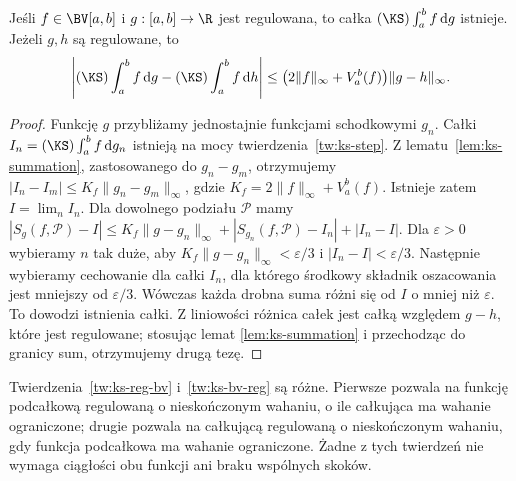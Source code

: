 \begin{twierdzenie}
\label{tw:ks-bv-reg}
Jeśli $f\in\BV[a,b]$ i $g:[a,b]\to\R$ jest regulowana, to całka $(\KS)\int_a^b f\,\mathrm dg$ istnieje. Jeżeli $g,h$ są regulowane, to
\[
 \left|(\KS)\int_a^b f\,\mathrm dg-(\KS)\int_a^b f\,\mathrm dh\right|
 \le\bigl(2\|f\|_\infty+V_a^b(f)\bigr)\|g-h\|_\infty.
\]
\end{twierdzenie}
\begin{proof}
Funkcję $g$ przybliżamy jednostajnie funkcjami schodkowymi $g_n$. Całki $I_n=(\KS)\int_a^b f\,\mathrm dg_n$ istnieją na mocy twierdzenia~\ref{tw:ks-step}. Z lematu~\ref{lem:ks-summation}, zastosowanego do $g_n-g_m$, otrzymujemy $|I_n-I_m|\le K_f\|g_n-g_m\|_\infty$, gdzie $K_f=2\|f\|_\infty+V_a^b(f)$. Istnieje zatem $I=\lim_nI_n$. Dla dowolnego podziału $\mathcal P$ mamy
$|S_g(f,\mathcal P)-I|\le K_f\|g-g_n\|_\infty+|S_{g_n}(f,\mathcal P)-I_n|+|I_n-I|$. Dla $\varepsilon>0$ wybieramy $n$ tak duże, aby $K_f\|g-g_n\|_\infty<\varepsilon/3$ i $|I_n-I|<\varepsilon/3$. Następnie wybieramy cechowanie dla całki $I_n$, dla którego środkowy składnik oszacowania jest mniejszy od $\varepsilon/3$. Wówczas każda drobna suma różni się od $I$ o mniej niż $\varepsilon$. To dowodzi istnienia całki. Z liniowości różnica całek jest całką względem $g-h$, które jest regulowane; stosując lemat \ref{lem:ks-summation} i przechodząc do granicy sum, otrzymujemy drugą tezę.
\end{proof}

\begin{uwaga}
Twierdzenia~\ref{tw:ks-reg-bv} i~\ref{tw:ks-bv-reg} są różne. Pierwsze pozwala na funkcję podcałkową regulowaną o nieskończonym wahaniu, o ile całkująca ma wahanie ograniczone; drugie pozwala na całkującą regulowaną o nieskończonym wahaniu, gdy funkcja podcałkowa ma wahanie ograniczone. Żadne z tych twierdzeń nie wymaga ciągłości obu funkcji ani braku wspólnych skoków.
\end{uwaga}

